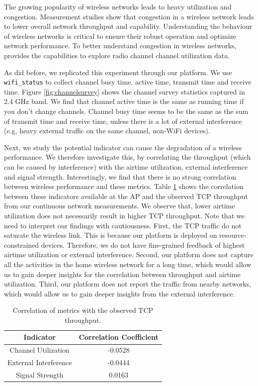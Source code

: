 The growing popularity of wireless networks leads to heavy utilization and congestion. Measurement studies show that congestion in a wireless network leads to lower overall network throughput and capability. Understanding the behaviour of wireless networks is critical to ensure their robust operation and optimize network performance. To better understand congestion in wireless networks, \sysname provides the capabilities to explore radio channel channel utilization data. 

As \cite{channelsurvey} did before, we replicated this experiment through our \sysname platform. We use \texttt{wifi\_status} to collect channel busy time, active time, transmit time and receive time. Figure \ref{fig:channelsurvey} shows the channel survey statistics captured in 2.4 GHz band. We find that channel active time is the same as running time if you don't change channels. Channel busy time seems to be the same as the sum of transmit time and receive time, unless there is a lot of external interference (e.g, heavy external traffic on the same channel, non-WiFi devices).

Next, we study the potential indicator can cause the degradation of a wireless performance. We therefore investigate this, by correlating the throughput (which can be caused by interference) with the airtime utilization, external interference and signal strength. Interestingly, we find that there is no strong correlation between wireless performance and these metrics. Table \ref{table: Correlation} shows the correlation between these indicators available at the AP and the observed TCP throughput from our continuous network measurements. We observe that, lower airtime utilization does not necessarily result in higher TCP throughput. Note that we need to interpret our findings with cautiousness. First, the TCP traffic do not saturate the wireless link. This is because our platform is deployed on resource-constrained devices. Therefore, we do not have fine-grained feedback of highest airtime utilization or external interference. Second, our platform does not capture all the activities in the home wireless network for a long time, which would allow us to gain deeper insights for the correlation between throughput and airtime utilization. Third, our platform does not report the traffic from nearby networks, which would allow us to gain deeper insights from the external interference.

\begin{table}[]
\centering
\begin{tabular}{ |c|c| }
\hline
Indicator               & Correlation Coefficient  \\ 
\hline
Channel Utilization               &-0.0528  \\ 
\hline
External Interference & -0.0444 \\ 
\hline
Signal Strength & 0.0163 \\
\hline
\end{tabular}
\caption{Correlation of metrics with the observed TCP throughput.}
\label{table: Correlation}
\end{table}

